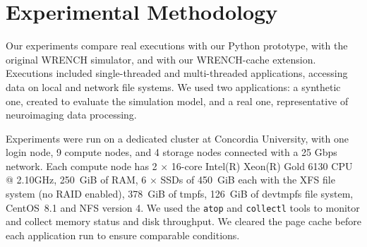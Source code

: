 \documentclass[conference]{IEEEtran}
\newcommand{\wrench}{WRENCH\xspace}
\begin{document}
        \section{Experimental Methodology}




        Our experiments compare real executions with our Python prototype,
        with the original \wrench simulator, and with our \wrench-cache
        extension. Executions included single-threaded and multi-threaded
        applications, accessing data on local and network file systems. We
        used two applications: a synthetic one, created to evaluate the
        simulation model, and a real one, representative of neuroimaging
        data processing.

        Experiments were run on a dedicated cluster at
        Concordia University, with one login node, 9 compute nodes, and 4
        storage nodes connected with a 25 Gbps network. Each
        compute node has 2 $\times$ 16-core Intel(R) Xeon(R) Gold 6130 CPU
        @ 2.10GHz, 250~GiB of RAM, 6 $\times$ SSDs of 450~GiB each with the XFS
        file system (no RAID enabled), 378~GiB of tmpfs, 126~GiB of devtmpfs file system,
        CentOS~8.1 and NFS version 4. We used the \texttt{atop}
        and \texttt{collectl} tools to monitor and collect memory status
        and disk throughput. We cleared the page
        cache before each application run to ensure comparable
        conditions.
\end{document}
